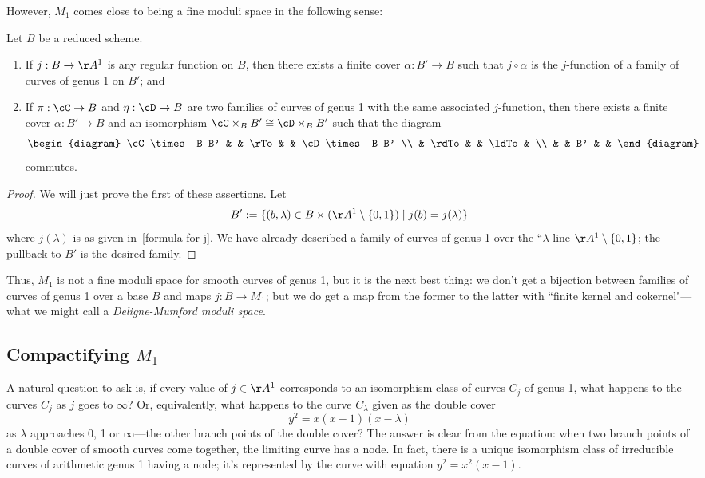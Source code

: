 However, $M_1$ comes close to being a fine moduli space in the following sense:

\begin{proposition}\label{families on pullbacks} Let $B$ be a reduced scheme.
\begin{enumerate}
\item If $j : B \to \AA^1$ is any regular function on $B$, then there exists a finite cover $\alpha : B' \to B$ such that $j \circ \alpha$ is the $j$-function of a family of curves of genus 1 on $B'$; and
\item If $\pi : \cC \to B$ and $\eta : \cD \to B$ are two families of curves of genus 1 with the same associated $j$-function, then there exists a finite cover $\alpha : B' \to B$ and an isomorphism $\cC \times_B B' \cong \cD \times_B B'$ such that the diagram
$$
\begin{diagram}
\cC \times_B B' & & \rTo & & \cD \times_B B' \\
& \rdTo & & \ldTo & \\
& & B' & &
\end{diagram} 
$$
commutes.
\end{enumerate}
\end{proposition}

\begin{proof} 
We will just prove the first of these assertions. Let
$$
B' := \{(b, \lambda) \in B \times (\AA^1 \setminus \{0,1\}) \mid j(b) = j(\lambda)\}
$$
where $j(\lambda)$ is as given in~\ref{formula for j}. We have already described a family of curves of genus 1 over the ``$\lambda$-line $\AA^1 \setminus \{0,1\}$; the pullback to $B'$ is the desired family.
\end{proof}

Thus, $M_1$ is not a fine moduli space for smooth curves of genus 1, but it is the next best thing: we don't get a bijection between families of curves of genus 1 over a base $B$ and maps $j : B \to M_1$; but we do get a map from the former to the latter with ``finite kernel and cokernel"---what we might call a \emph{Deligne-Mumford moduli space}.

\subsection{Compactifying $M_1$}

A natural question to ask is, if every value of $j \in \AA^1$ corresponds to an isomorphism class of curves $C_j$ of genus 1, what happens to the curves $C_j$ as $j$ goes to $\infty$? Or, equivalently, what happens to the curve $C_\lambda$ given as the double cover
$$
y^2 = x(x-1)(x - \lambda)
$$
as $\lambda$ approaches 0, 1 or $\infty$---the other branch points of the double cover? The answer is clear from the equation: when two branch points of a double cover of smooth curves come together, the limiting curve has a node. In fact, there is a unique isomorphism class of irreducible curves of arithmetic genus 1 having a node; it's represented by the curve with equation $y^2=x^2(x-1)$.

